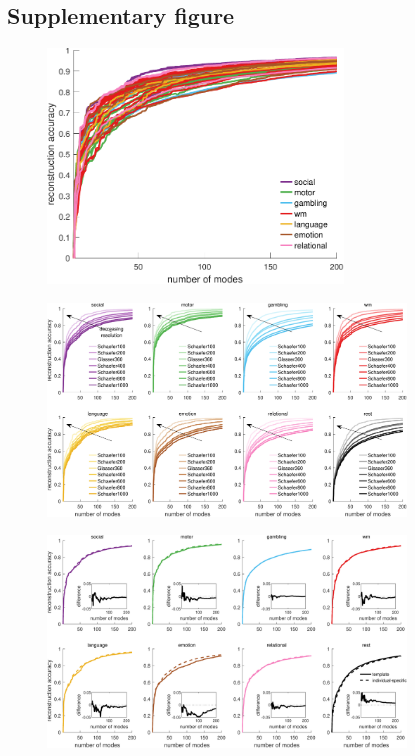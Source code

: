 \documentclass[sn-mathphys-num]{sn-jnl}%
\theoremstyle{thmstyleone}%
\theoremstyle{thmstyletwo}%
\theoremstyle{thmstylethree}%
\begin{document}
\begin{appendices}
\begin{table}[htbp]
\begin{tabular}{ccc}
		\bottomrule
	\end{tabular}%
	\label{tab:spatial_wavelength}%
\end{table}%


\subsection{Supplementary figure}\label{secS1}



\begin{figure}[!htb] 
	\centering
	\includegraphics[width=0.7\textwidth]{fig/supp_1.pdf}
	\caption{} \label{fig:supp_1}
\end{figure}


\begin{figure}[!htb] 
	\centering
	\includegraphics[width=0.85\textwidth]{fig/supp_2.pdf}
	\caption{} \label{fig:supp_2}
\end{figure}


\begin{figure}[!htb] 
	\centering
	\includegraphics[width=0.85\textwidth]{fig/supp_3.pdf}
	\caption{} \label{fig:supp_3}
\end{figure}



\end{appendices}
\end{document}
